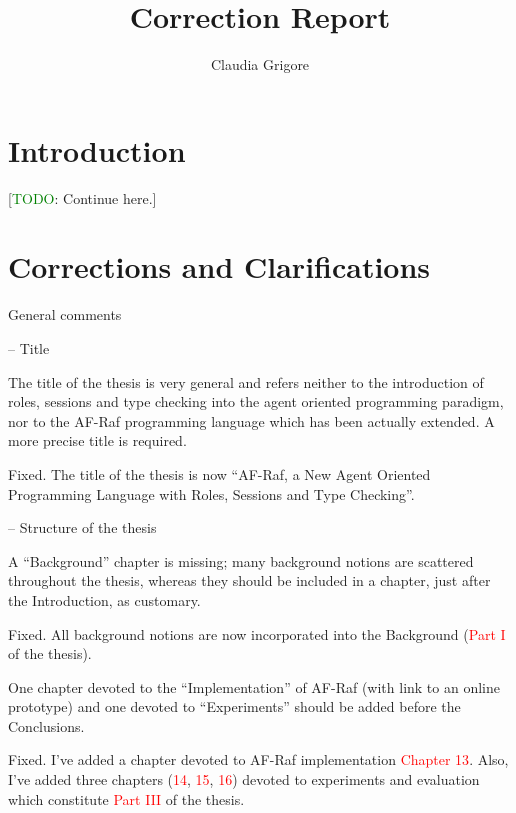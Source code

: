 \documentclass{article}
\title{Correction Report}
\author{Claudia Grigore}
\newcommand*\R[1]{\textcolor{red}{#1}} %
\newcommand{\todo}[1]{[\textcolor{green}{TODO}: #1]}
\newenvironment{them}{\noindent\begingroup\color{blue}}{\endgroup\par}
\begin{document}
\maketitle

\section{Introduction}

\todo{Continue here.}
\section{Corrections and Clarifications}

\begin{them}
General comments
\end{them}


\begin{them}
-- Title

The title of the thesis is very general and refers neither to the introduction
of roles, sessions and type checking into the agent oriented programming
paradigm, nor to the AF-Raf programming language which has been actually
extended. A more precise title is required.

\end{them}
Fixed. The title of the thesis is now ``AF-Raf, a New Agent Oriented Programming
Language with Roles, Sessions and Type Checking''.

\begin{them}

-- Structure of the thesis

A ``Background'' chapter is missing; many background notions are scattered
throughout the thesis, whereas they should be included in a chapter, just after
the Introduction, as customary.

\end{them}
Fixed. All background notions are now incorporated into the Background (\R{Part
I} of the thesis).

\begin{them}

One chapter devoted to the ``Implementation'' of AF-Raf (with link to an online
prototype) and one devoted to ``Experiments'' should be added before the
Conclusions.

\end{them}
Fixed. I've added a chapter devoted to AF-Raf implementation \R{Chapter 13}.
Also, I've added three chapters (\R{14}, \R{15}, \R{16}) devoted to experiments
and evaluation which constitute \R{Part III} of the thesis.
\end{document}
